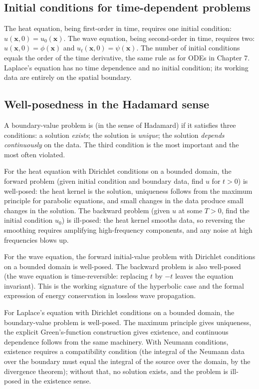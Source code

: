 \subsection{Initial conditions for time-dependent problems}

The heat equation, being first-order in time, requires one initial
condition: $u(\mathbf{x}, 0) = u_{0}(\mathbf{x})$. The wave
equation, being second-order in time, requires two: $u(\mathbf{x},
0) = \phi(\mathbf{x})$ and $u_{t}(\mathbf{x}, 0) =
\psi(\mathbf{x})$. The number of initial conditions equals the
order of the time derivative, the same rule as for ODEs in
Chapter 7. Laplace's equation has no time dependence and no
initial condition; its working data are entirely on the spatial
boundary.

\subsection{Well-posedness in the Hadamard sense}

A boundary-value problem is  (in the sense of
Hadamard) if it satisfies three conditions: a solution
\textit{exists}; the solution is \textit{unique}; the solution
\textit{depends continuously} on the data. The third condition is
the most important and the most often violated.

For the heat equation with Dirichlet conditions on a bounded
domain, the forward problem (given initial condition and boundary
data, find $u$ for $t > 0$) is well-posed: the heat kernel is the
solution, uniqueness follows from the maximum principle for
parabolic equations, and small changes in the data produce small
changes in the solution. The backward problem (given $u$ at some
$T > 0$, find the initial condition $u_{0}$) is ill-posed: the
heat kernel smooths data, so reversing the smoothing requires
amplifying high-frequency components, and any noise at high
frequencies blows up.

For the wave equation, the forward initial-value problem with
Dirichlet conditions on a bounded domain is well-posed. The
backward problem is also well-posed (the wave equation is
time-reversible: replacing $t$ by $-t$ leaves the equation
invariant). This is the working signature of the hyperbolic case
and the formal expression of energy conservation in lossless wave
propagation.

For Laplace's equation with Dirichlet conditions on a bounded
domain, the boundary-value problem is well-posed. The maximum
principle gives uniqueness, the explicit Green's-function
construction gives existence, and continuous dependence follows
from the same machinery. With Neumann conditions, existence
requires a compatibility condition (the integral of the Neumann
data over the boundary must equal the integral of the source over
the domain, by the divergence theorem); without that, no solution
exists, and the problem is ill-posed in the existence sense.

